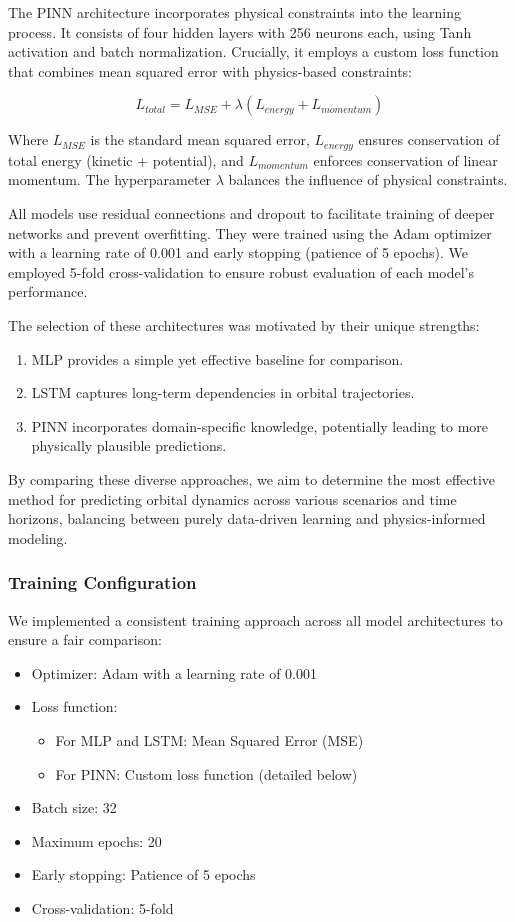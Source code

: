 \documentclass[12pt,a4paper]{article}
\begin{document}
The PINN architecture incorporates physical constraints into the learning process. It consists of four hidden layers with 256 neurons each, using Tanh activation and batch normalization. Crucially, it employs a custom loss function that combines mean squared error with physics-based constraints:

\begin{equation}
L_{total} = L_{MSE} + \lambda(L_{energy} + L_{momentum})
\end{equation}

Where $L_{MSE}$ is the standard mean squared error, $L_{energy}$ ensures conservation of total energy (kinetic + potential), and $L_{momentum}$ enforces conservation of linear momentum. The hyperparameter $\lambda$ balances the influence of physical constraints.

All models use residual connections and dropout to facilitate training of deeper networks and prevent overfitting. They were trained using the Adam optimizer with a learning rate of 0.001 and early stopping (patience of 5 epochs). We employed 5-fold cross-validation to ensure robust evaluation of each model's performance.

The selection of these architectures was motivated by their unique strengths:

\begin{enumerate}
    \item MLP provides a simple yet effective baseline for comparison.
    \item LSTM captures long-term dependencies in orbital trajectories.
    \item PINN incorporates domain-specific knowledge, potentially leading to more physically plausible predictions.
\end{enumerate}

By comparing these diverse approaches, we aim to determine the most effective method for predicting orbital dynamics across various scenarios and time horizons, balancing between purely data-driven learning and physics-informed modeling.
\subsubsection{Training Configuration}
We implemented a consistent training approach across all model architectures to ensure a fair comparison:

\begin{itemize}
    \item Optimizer: Adam with a learning rate of 0.001
    \item Loss function:
        \begin{itemize}
            \item For MLP and LSTM: Mean Squared Error (MSE)
            \item For PINN: Custom loss function (detailed below)
        \end{itemize}
    \item Batch size: 32
    \item Maximum epochs: 20
    \item Early stopping: Patience of 5 epochs
    \item Cross-validation: 5-fold
\end{itemize}
\end{document}
